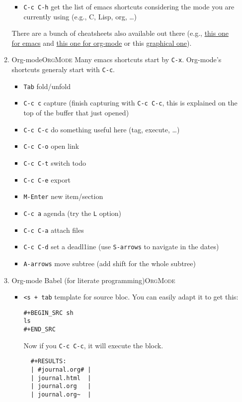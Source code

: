 \documentclass[11pt]{article}
\begin{document}
\begin{enumerate}
\begin{enumerate}
\begin{itemize}
\item \texttt{C-c C-h} get the list of emacs shortcuts considering the mode you are
currently using (e.g., C, Lisp, org, \ldots{})
\end{itemize}
There are a bunch of cheatsheets also available out there (e.g.,
\href{http://www.shortcutworld.com/en/linux/Emacs\_23.2.1.html}{this one for emacs} and \href{http://orgmode.org/orgcard.txt}{this one for org-mode} or this \href{http://sachachua.com/blog/wp-content/uploads/2013/05/How-to-Learn-Emacs-v2-Large.png}{graphical one}).
\item Org-mode\hfill{}\textsc{OrgMode}
\label{sec:org9098f78}
Many emacs shortcuts start by \texttt{C-x}. Org-mode's shortcuts generaly
start with \texttt{C-c}.
\begin{itemize}
\item \texttt{Tab} fold/unfold
\item \texttt{C-c c} capture (finish capturing with \texttt{C-c C-c}, this is explained on
the top of the buffer that just opened)
\item \texttt{C-c C-c} do something useful here (tag, execute, \ldots{})
\item \texttt{C-c C-o} open link
\item \texttt{C-c C-t} switch todo
\item \texttt{C-c C-e} export
\item \texttt{M-Enter} new item/section
\item \texttt{C-c a} agenda (try the \texttt{L} option)
\item \texttt{C-c C-a} attach files
\item \texttt{C-c C-d} set a deadl1ine (use \texttt{S-arrows} to navigate in the dates)
\item \texttt{A-arrows} move subtree (add shift for the whole subtree)
\end{itemize}
\item Org-mode Babel (for literate programming)\hfill{}\textsc{OrgMode}
\label{sec:orgf5595a8}
\begin{itemize}
\item \texttt{<s + tab} template for source bloc. You can easily adapt it to get this:
\begin{verbatim}
#+BEGIN_SRC sh
ls
#+END_SRC
\end{verbatim}
Now if you \texttt{C-c C-c}, it will execute the block.
\begin{verbatim}
  #+RESULTS:
  | #journal.org# |
  | journal.html  |
  | journal.org   |
  | journal.org~  |
\end{verbatim}


\end{itemize}
\end{enumerate}
\end{enumerate}
\end{document}
